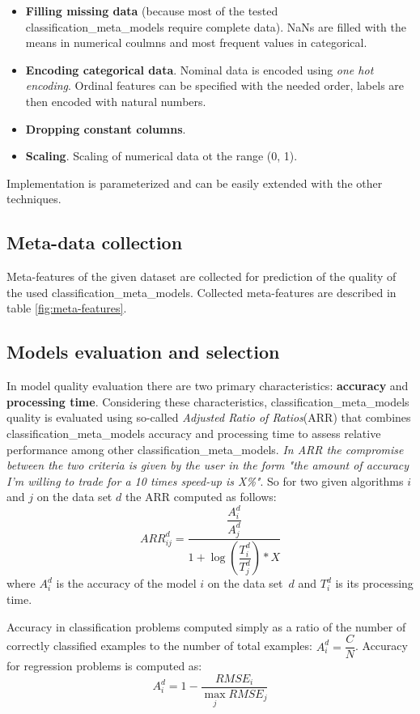 \documentclass[hidelinks, english]{mvi-report}
\begin{document}
\begin{itemize}
    \item \textbf{Filling missing data} (because most of the tested classification_meta_models require complete data). NaNs are filled with
    the means in numerical coulmns and most frequent values in categorical.
    \item \textbf{Encoding categorical data}. Nominal data is encoded using \textit{one hot encoding}. Ordinal features
    can be specified with the needed order, labels are then encoded with natural numbers.
    \item \textbf{Dropping constant columns}.
    \item \textbf{Scaling}. Scaling of numerical data ot the range (0, 1).
\end{itemize}

Implementation is parameterized and can be easily extended with the other techniques.

\subsection{Meta-data collection}

Meta-features of the given dataset are collected for prediction of the quality of the used classification_meta_models. Collected
meta-features are described in table \ref{fig:meta-features}.


\subsection{Models evaluation and selection}
In model quality evaluation there are two primary characteristics: \textbf{accuracy} and \textbf{processing time}.
Considering these characteristics, classification_meta_models quality is evaluated using so-called \textit{Adjusted Ratio of Ratios}(ARR)
that combines classification_meta_models accuracy and processing time to assess relative performance among other classification_meta_models. \textit{In ARR
the compromise between the two criteria is given by the user in the form "the amount of accuracy I'm willing to trade for
a 10 times speed-up is X\%"}\cite{sampling-based-relative-landmarks}. So for two given algorithms $i$ and $j$ on
the data set $d$ the ARR computed as follows:
$$ ARR^d_{ij} = \dfrac{\dfrac{A^d_i}{A^d_j}}{1+\log{(\dfrac{T^d_i}{T^d_j})}*X} $$
where $A^d_i$ is the accuracy of the model $i$ on the data set~$d$ and $T^d_i$ is its processing time.

Accuracy in classification problems computed simply as a ratio of the number of correctly classified examples to
the number of total examples: $ A^d_i = \dfrac{C}{N} $. Accuracy for regression problems is computed as:
$$ A^d_i = 1 - \dfrac{RMSE_i}{\max_{j}RMSE_j} $$
\end{document}
